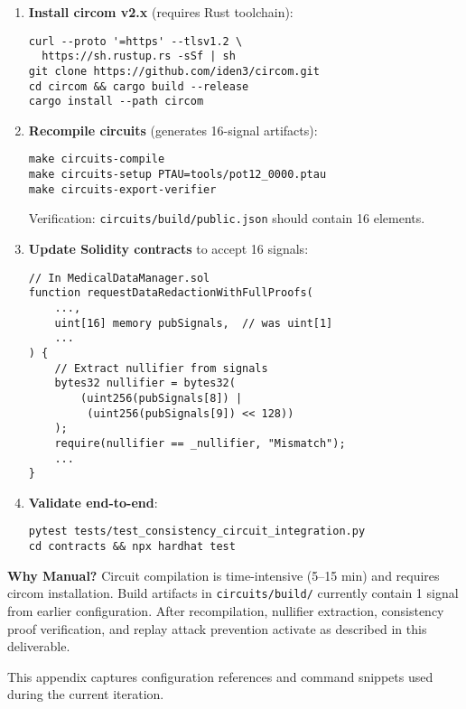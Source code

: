 \begin{enumerate}
    \item \textbf{Install circom v2.x} (requires Rust toolchain):
    \begin{verbatim}
curl --proto '=https' --tlsv1.2 \
  https://sh.rustup.rs -sSf | sh
git clone https://github.com/iden3/circom.git
cd circom && cargo build --release
cargo install --path circom
    \end{verbatim}
    
    \item \textbf{Recompile circuits} (generates 16-signal artifacts):
    \begin{verbatim}
make circuits-compile
make circuits-setup PTAU=tools/pot12_0000.ptau
make circuits-export-verifier
    \end{verbatim}
    Verification: \texttt{circuits/build/public.json} should contain 16 elements.
    
    \item \textbf{Update Solidity contracts} to accept 16 signals:
    \begin{verbatim}
// In MedicalDataManager.sol
function requestDataRedactionWithFullProofs(
    ...,
    uint[16] memory pubSignals,  // was uint[1]
    ...
) {
    // Extract nullifier from signals
    bytes32 nullifier = bytes32(
        (uint256(pubSignals[8]) | 
         (uint256(pubSignals[9]) << 128))
    );
    require(nullifier == _nullifier, "Mismatch");
    ...
}
    \end{verbatim}
    
    \item \textbf{Validate end-to-end}:
    \begin{verbatim}
pytest tests/test_consistency_circuit_integration.py
cd contracts && npx hardhat test
    \end{verbatim}
\end{enumerate}

\textbf{Why Manual?} Circuit compilation is time-intensive (5--15 min) and requires circom installation. Build artifacts in \texttt{circuits/build/} currently contain 1 signal from earlier configuration. After recompilation, nullifier extraction, consistency proof verification, and replay attack prevention activate as described in this deliverable.

This appendix captures configuration references and command snippets used during the current iteration.


